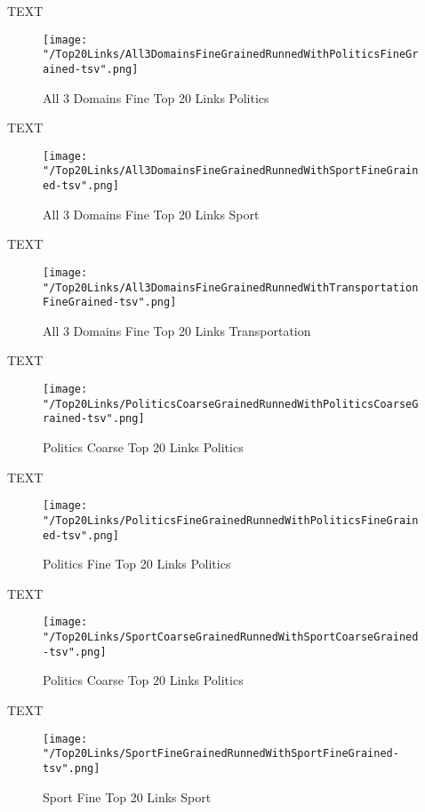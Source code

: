 \documentclass[thesis=M,english]{FITthesis}[2018/05/30]
\begin{document}
	TEXT

	\begin{figure}\centering
		\texttt{[image: "/Top20Links/All3DomainsFineGrainedRunnedWithPoliticsFineGrained-tsv".png]}
		\caption{All 3 Domains Fine Top 20 Links Politics}\label{}
	\end{figure}	

	TEXT	

	\begin{figure}\centering
		\texttt{[image: "/Top20Links/All3DomainsFineGrainedRunnedWithSportFineGrained-tsv".png]}
		\caption{All 3 Domains Fine Top 20 Links Sport}\label{}
	\end{figure}
	
		TEXT	

	\begin{figure}\centering
		\texttt{[image: "/Top20Links/All3DomainsFineGrainedRunnedWithTransportationFineGrained-tsv".png]}
		\caption{All 3 Domains Fine Top 20 Links Transportation}\label{}	
	\end{figure}
	
	TEXT

	\begin{figure}\centering
		\texttt{[image: "/Top20Links/PoliticsCoarseGrainedRunnedWithPoliticsCoarseGrained-tsv".png]}
		\caption{Politics Coarse Top 20 Links Politics}\label{}
	\end{figure}	

	TEXT	

	\begin{figure}\centering
		\texttt{[image: "/Top20Links/PoliticsFineGrainedRunnedWithPoliticsFineGrained-tsv".png]}
		\caption{Politics Fine Top 20 Links Politics}\label{}
	\end{figure}

	
	TEXT

	\begin{figure}\centering
		\texttt{[image: "/Top20Links/SportCoarseGrainedRunnedWithSportCoarseGrained-tsv".png]}
		\caption{Politics Coarse Top 20 Links Politics}\label{}
	\end{figure}		
	
		TEXT	

	\begin{figure}\centering
		\texttt{[image: "/Top20Links/SportFineGrainedRunnedWithSportFineGrained-tsv".png]}
		\caption{Sport Fine Top 20 Links Sport}\label{}	
	\end{figure}
\end{document}
